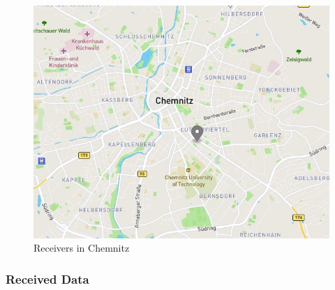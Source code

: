 \documentclass[aspectratio=169]{beamer}
\begin{document}
\begin{frame}
\begin{figure}
\begin{columns}
\begin{center}
\includegraphics[height=0.6\textheight]{figs/map_chemnitz.jpg}
\end{center}
\caption{Receivers in Chemnitz}

\end{columns}
\end{figure}
\end{frame}


\begin{frame}
\frametitle{Received Data}

\end{frame}

\end{document}
